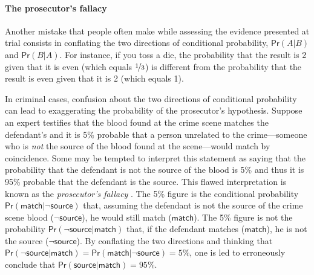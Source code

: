 \documentclass{article}
\newcommand{\pr}{\mathsf{Pr}}
\begin{document}
\paragraph{The prosecutor's fallacy}

Another mistake that people often make while assessing the evidence presented at trial consists in conflating the two directions of conditional probability, $\pr(A\vert B)$ and $\pr(B \vert A)$. For instance, if you toss a die, the probability that the result is 2 given that it is even (which equals $\nicefrac{1}{3}$) is different from the probability that the result is even given that it is 2 (which equals 1). 
%

In criminal cases, confusion about the two directions of conditional probability can lead to exaggerating the probability of the prosecutor's hypothesis.   Suppose an expert testifies that the blood found at the crime scene matches the defendant's and it is 5\% probable that a person unrelated to the crime---someone who is \textit{not} the source of the blood found at the  scene---would match by coincidence. Some may be tempted to interpret this statement as saying that the probability  that the defendant is not the source of the blood  is 5\% and thus it is  95\% probable that the defendant is the source. This flawed interpretation  is known as the \textit{prosecutor's fallacy} \citep{thompson1987interpretation}. 
% 
The 5\% figure is the conditional probability $\pr(\textsf{match} \vert \neg \textsf{source})$ that, assuming the defendant is not the source of the crime scene blood ($\neg \textsf{source}$), he would still match ($\textsf{match}$). The 5\% figure is not the probability $\pr(\neg \textsf{source} \vert \textsf{match})$ that, if the defendant matches ($\textsf{match}$), he is not the source ($\neg \textsf{source}$). %
By  conflating the two directions and thinking that $\pr(\neg \textsf{source} \vert \textsf{match})=\pr(\textsf{match} \vert \neg \textsf{source})=5\%$, one is led to erroneously  conclude that $\pr (\textsf{source} | \textsf{match})=95\%$. 
\end{document}
